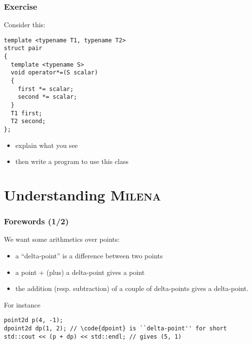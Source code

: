 \documentclass{beamer}
\newcommand{\code}[1]{{\scriptsize{\texttt{#1}}}\xspace}
\newcommand{\mln}{\textsc{Milena}\xspace}
\begin{document}
\begin{frame}[fragile]
  \frametitle{Exercise}

Consider this:
\begin{lstlisting}
template <typename T1, typename T2>
struct pair
{
  template <typename S>
  void operator*=(S scalar)
  {
    first *= scalar;
    second *= scalar;
  }
  T1 first;
  T2 second;
};
\end{lstlisting}

\smallskip

\begin{itemize}
\item explain what you see
\item then write a program to use this class
\end{itemize}

\end{frame}




\section{Understanding \mln}


\begin{frame}[fragile]
  \frametitle{Forewords (1/2)}

We want some arithmetics over points:
\begin{itemize}
\item a ``delta-point'' is a difference between two points
\item a point + (plus) a delta-point gives a point
\item the addition (resp. subtraction) of a couple of delta-points gives a delta-point. 
\end{itemize}

\smallskip

For instance
\begin{lstlisting}
point2d p(4, -1);
dpoint2d dp(1, 2); // \code{dpoint} is ``delta-point'' for short
std::cout << (p + dp) << std::endl; // gives (5, 1)
\end{lstlisting}

\end{frame}
\end{document}
